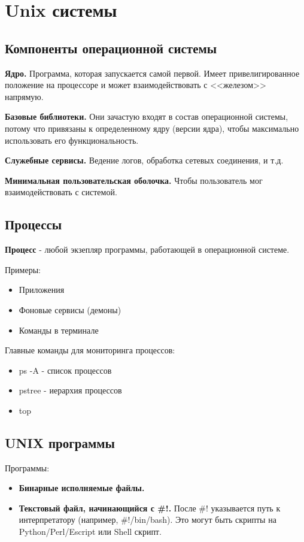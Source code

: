 \section{Unix системы}

\subsection{Компоненты операционной системы}

\textbf{Ядро.} Программа, которая запускается самой первой. Имеет привелигированное
положение на процессоре и может взаимодействовать с <<железом>> напрямую.

\textbf{Базовые библиотеки.} Они зачастую входят в состав операционной системы, потому что 
привязаны к определенному ядру (версии ядра), чтобы максимально использовать его функциональность. 

\textbf{Служебные сервисы.} Ведение логов, обработка сетевых соединения, и т.д.

\textbf{Минимальная пользовательская оболочка.} Чтобы пользователь мог взаимодействовать с системой.

\subsection{Процессы}

\textbf{Процесс} - любой экзепляр программы, работающей в операционной системе.

Примеры:
\begin{itemize}
	\item Приложения
	\item Фоновые сервисы (демоны)
	\item Команды в терминале
\end{itemize}

Главные команды для мониторинга процессов:
\begin{itemize}
	\item ps -A - список процессов
	\item pstree - иерархия процессов
	\item top
\end{itemize}

\subsection{UNIX программы}

Программы:
\begin{itemize}
	\item \textbf{Бинарные исполняемые файлы.}
	\item \textbf{Текстовый файл, начинающийся с \#!.} После \#! указывается путь к интерпретатору (например, \#!/bin/bash). Это могут быть скрипты на Python/Perl/Escript или Shell скрипт.
\end{itemize}

